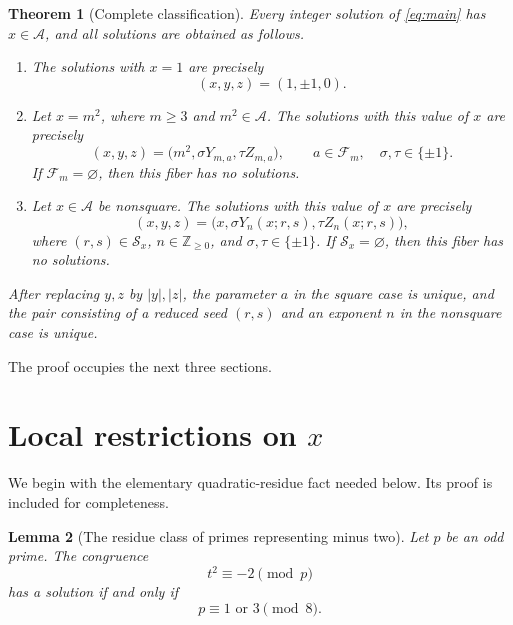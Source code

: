\documentclass[11pt,a4paper]{amsart}
\newtheorem{theorem}{Theorem}[section]
\newtheorem{lemma}[theorem]{Lemma}
\theoremstyle{definition}
\newcommand{\Z}{\mathbb Z}
\newcommand{\Acal}{\mathcal A}
\newcommand{\Fcal}{\mathcal F}
\newcommand{\Scal}{\mathcal S}
\numberwithin{equation}{section}
\begin{document}
\begin{theorem}[Complete classification]
\label{thm:classification}
Every integer solution of \eqref{eq:main} has \(x\in\Acal\), and all solutions are
obtained as follows.

\begin{enumerate}
\item The solutions with \(x=1\) are precisely
\begin{equation}
 (x,y,z)=(1,\pm1,0).
 \label{eq:x1-solutions}
\end{equation}

\item Let \(x=m^2\), where \(m\geq3\) and \(m^2\in\Acal\).  The solutions with this
value of \(x\) are precisely
\begin{equation}
 (x,y,z)=\bigl(m^2,\sigma Y_{m,a},\tau Z_{m,a}\bigr),
 \qquad
 a\in\Fcal_m,
 \quad \sigma,\tau\in\{\pm1\}.
 \label{eq:square-classification}
\end{equation}
If \(\Fcal_m=\varnothing\), then this fiber has no solutions.

\item Let \(x\in\Acal\) be nonsquare.  The solutions with this value of \(x\) are
precisely
\begin{equation}
 (x,y,z)=\bigl(x,\sigma Y_n(x;r,s),\tau Z_n(x;r,s)\bigr),
 \label{eq:nonsquare-classification}
\end{equation}
where \((r,s)\in\Scal_x\), \(n\in\Z_{\geq0}\), and
\(\sigma,\tau\in\{\pm1\}\).  If \(\Scal_x=\varnothing\), then this fiber has no
solutions.
\end{enumerate}

After replacing \(y,z\) by \(|y|,|z|\), the parameter \(a\) in the square case is
unique, and the pair consisting of a reduced seed \((r,s)\) and an exponent \(n\) in
the nonsquare case is unique.
\end{theorem}

The proof occupies the next three sections.

\section{Local restrictions on \texorpdfstring{$x$}{x}}

We begin with the elementary quadratic-residue fact needed below.  Its proof is
included for completeness.

\begin{lemma}[The residue class of primes representing minus two]
\label{lem:minus-two}
Let \(p\) be an odd prime.  The congruence
\begin{equation}
 t^2\equiv-2\pmod p
 \label{eq:minus-two-congruence}
\end{equation}
has a solution if and only if
\begin{equation}
 p\equiv1\text{ or }3\pmod8.
 \label{eq:minus-two-criterion}
\end{equation}
\end{lemma}
\end{document}
